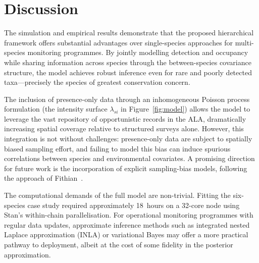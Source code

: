 \section{Discussion}

The simulation and empirical results demonstrate that the proposed hierarchical
framework offers substantial advantages over single-species approaches for
multi-species monitoring programmes. By jointly modelling detection and
occupancy while sharing information across species through the
between-species covariance structure, the model achieves robust inference
even for rare and poorly detected taxa—precisely the species of greatest
conservation concern.

The inclusion of presence-only data through an inhomogeneous Poisson process
formulation (the intensity surface $\lambda_{si}$ in Figure~\ref{fig:model})
allows the model to leverage the vast repository of opportunistic records in
the ALA, dramatically increasing spatial coverage relative to structured
surveys alone. However, this integration is not without challenges: presence-only
data are subject to spatially biased sampling effort, and failing to model this
bias can induce spurious correlations between species and environmental
covariates. A promising direction for future work is the incorporation of
explicit sampling-bias models, following the approach of
Fithian~\cite{elith2009}.

The computational demands of the full model are non-trivial. Fitting the
six-species case study required approximately 18~hours on a 32-core node using
Stan's within-chain parallelisation. For operational monitoring programmes with
regular data updates, approximate inference methods such as integrated nested
Laplace approximation (INLA) or variational Bayes may offer a more practical
pathway to deployment, albeit at the cost of some fidelity in the posterior
approximation.

